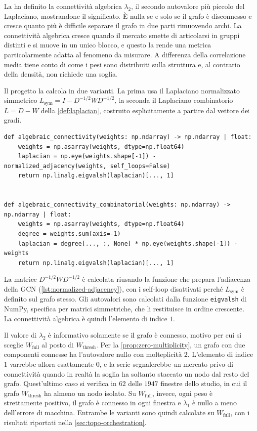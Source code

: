 La  ha definito la connettività algebrica $\lambda_2$, il secondo autovalore più piccolo del Laplaciano, mostrandone il significato. È nulla se e solo se il grafo è disconnesso e cresce quanto più è difficile separare il grafo in due parti rimuovendo archi. La connettività algebrica cresce quando il mercato smette di articolarsi in gruppi distinti e si muove in un unico blocco, e questo la rende una metrica particolarmente adatta al fenomeno da misurare. A differenza della correlazione media tiene conto di come i pesi sono distribuiti sulla struttura e, al contrario della densità, non richiede una soglia.

Il progetto la calcola in due varianti. La prima usa il Laplaciano normalizzato simmetrico $L_{\mathrm{sym}} = I - D^{-1/2}WD^{-1/2}$, la seconda il Laplaciano combinatorio $L=D-W$ della \cref{def:laplacian}, costruito esplicitamente a partire dal vettore dei gradi.

\begin{listing}[H]
\begin{verbatim}
def algebraic_connectivity(weights: np.ndarray) -> np.ndarray | float:
    weights = np.asarray(weights, dtype=np.float64)
    laplacian = np.eye(weights.shape[-1]) - normalized_adjacency(weights, self_loops=False)
    return np.linalg.eigvalsh(laplacian)[..., 1]


def algebraic_connectivity_combinatorial(weights: np.ndarray) -> np.ndarray | float:
    weights = np.asarray(weights, dtype=np.float64)
    degree = weights.sum(axis=-1)
    laplacian = degree[..., :, None] * np.eye(weights.shape[-1]) - weights
    return np.linalg.eigvalsh(laplacian)[..., 1]
\end{verbatim}
\caption{\texttt{algebraic\_connectivity} e \texttt{algebraic\_connectivity\_combinatorial}}
\label{lst:algebraic-connectivity}
\end{listing}

La matrice $D^{-1/2}WD^{-1/2}$ è calcolata riusando la funzione che prepara l'adiacenza della GCN (\cref{lst:normalized-adjacency}), con i self-loop disattivati perché $L_{\mathrm{sym}}$ è definito sul grafo stesso. Gli autovalori sono calcolati dalla funzione \texttt{eigvalsh} di NumPy, specifica per matrici simmetriche, che li restituisce in ordine crescente. La connettività algebrica è quindi l'elemento di indice $1$.

Il valore di $\lambda_2$ è informativo solamente se il grafo è connesso, motivo per cui si sceglie $W_{\mathrm{full}}$ al posto di $W_{\mathrm{thresh}}$. Per la \cref{prop:zero-multiplicity}, un grafo con due componenti connesse ha l'autovalore nullo con molteplicità $2$. L'elemento di indice $1$ varrebbe allora esattamente $0$, e la serie segnalerebbe un mercato privo di connettività quando in realtà la soglia ha soltanto staccato un nodo dal resto del grafo. Quest'ultimo caso si verifica in $62$ delle $1947$ finestre dello studio, in cui il grafo $W_{\mathrm{thresh}}$ ha almeno un nodo isolato. Su $W_{\mathrm{full}}$, invece, ogni peso è strettamente positivo, il grafo è connesso in ogni finestra e $\lambda_1$ è nullo a meno dell'errore di macchina. Entrambe le varianti sono quindi calcolate su $W_{\mathrm{full}}$, con i risultati riportati nella \cref{sec:topo-orchestration}.

